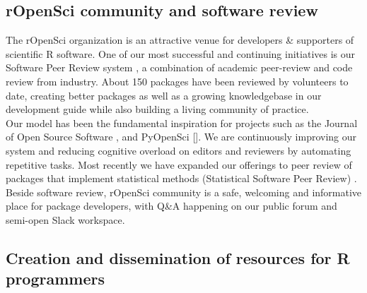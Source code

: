 \hypertarget{ropensci-community-and-software-review}{%
\subsection{rOpenSci community and software
review}\label{ropensci-community-and-software-review}}

The rOpenSci organization \citep{building} is an attractive venue for
developers \& supporters of scientific R software. One of our most
successful and continuing initiatives is our Software Peer Review system
\citep{cop}, a combination of academic peer-review and code review from
industry. About 150 packages have been reviewed by volunteers to date,
creating better packages as well as a growing knowledgebase in our
development guide \citep{devguide} while also building a living
community of practice.\\
Our model has been the fundamental inspiration for projects such as the
Journal of Open Source Software \citep{Smith2018}, and PyOpenSci
{[}\citet{pyopensci}{]}\citep{pyopensci2}. We are continuously improving
our system and reducing cognitive overload on editors and reviewers by
automating repetitive tasks. Most recently we have expanded our
offerings to peer review of packages that implement statistical methods
(Statistical Software Peer Review) \citep{mark_padgham_2021_5556756}.\\
Beside software review, rOpenSci community is a safe, welcoming and
informative place for package developers, with Q\&A happening on our
public forum and semi-open Slack workspace. \citep{ctbguide}

\hypertarget{creation-and-dissemination-of-resources-for-r-programmers}{%
\subsection{Creation and dissemination of resources for R
programmers}\label{creation-and-dissemination-of-resources-for-r-programmers}}

